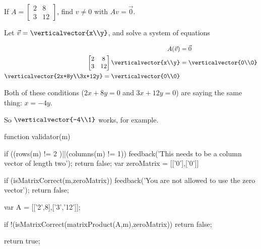 \documentclass{ximera}
\begin{document}
\begin{question}
  If $A = \begin{bmatrix} 2 & 8\\3&12\end{bmatrix}$, find $v \neq 0$ with $Av = \vec{0}$.
  \begin{solution}
  \begin{hint}
  	Let $\vec{v} = \verticalvector{x\\y}$, and solve a system of equations
  \end{hint}
  \begin{hint}
  	\begin{align*}
  		A(\vec{v}) &= \vec{0}\\
  		\begin{bmatrix} 2 & 8\\3&12\end{bmatrix}\verticalvector{x\\y}  &=\verticalvector{0\\0}\\
  		\verticalvector{2x+8y\\3x+12y} = \verticalvector{0\\0}
  	\end{align*}
  \end{hint}
  \begin{hint}
  	Both of these conditions ($2x+8y  =0$ and $3x+12y = 0$) are saying the same thing:  $x = -4y$.
  \end{hint}
  \begin{hint}
  	So $\verticalvector{-4\\1}$ works, for example.
  \end{hint}
  	\begin{matrix-answer}[name=v]
  		function validator(m){
  		if ((rows(m) != 2 )||(columns(m) != 1)){
  			feedback('This needs to be a column vector of length two');
  			return false;
  			}
  		var zeroMatrix = [['0'],['0']]
  		
  		if (isMatrixCorrect(m,zeroMatrix)){
  			feedback('You are not allowed to use the zero vector');
  			return false;
  			}
  		
  		var A = [['2',8],['3','12']];
  		
  		if !(isMatrixCorrect(matrixProduct(A,m),zeroMatrix)){
  			return false;
  			}
  		
  		return true;
  		}
  	\end{matrix-answer}
  \end{solution}
\end{question}
	
\end{document}
